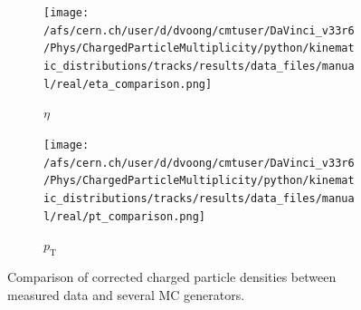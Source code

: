 \begin{figure}[H]
	\centering
	\begin{subfigure}{0.49\textwidth}
		\texttt{[image: /afs/cern.ch/user/d/dvoong/cmtuser/DaVinci\_v33r6/Phys/ChargedParticleMultiplicity/python/kinematic\_distributions/tracks/results/data\_files/manual/real/eta\_comparison.png]}
		\caption{$\eta$}
		\label{fig: charged particle density, eta result}
	\end{subfigure}
	\begin{subfigure}{0.49\textwidth}
		\texttt{[image: /afs/cern.ch/user/d/dvoong/cmtuser/DaVinci\_v33r6/Phys/ChargedParticleMultiplicity/python/kinematic\_distributions/tracks/results/data\_files/manual/real/pt\_comparison.png]}
		\caption{$p_\mathrm{T}$}
		\label{fig: charged particle density, pt result}
	\end{subfigure}
	\caption{Comparison of corrected charged particle densities between measured data and several MC generators.}
	\label{fig: corrected charged particle densities, comparison}
\end{figure}
